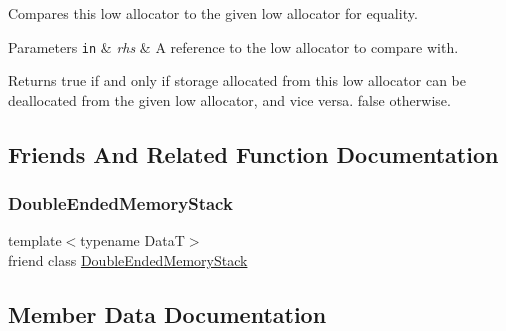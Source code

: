 Compares this low allocator to the given low allocator for equality.


\begin{DoxyParams}[1]{Parameters}
\mbox{\tt in}  & {\em rhs} & A reference to the low allocator to compare with. \\
\hline
\end{DoxyParams}
\begin{DoxyReturn}{Returns}
{\ttfamily true} if and only if storage allocated from this low allocator can be deallocated from the given low allocator, and vice versa. {\ttfamily false} otherwise. 
\end{DoxyReturn}


\subsection{Friends And Related Function Documentation}
\hypertarget{structmage_1_1_double_ended_memory_stack_1_1_low_allocator_a10ae729d55b8c0017057250445835680}{}\label{structmage_1_1_double_ended_memory_stack_1_1_low_allocator_a10ae729d55b8c0017057250445835680} 
\subsubsection{\texorpdfstring{Double\+Ended\+Memory\+Stack}{DoubleEndedMemoryStack}}
{\footnotesize\ttfamily template$<$typename DataT$>$ \\
friend class \hyperlink{classmage_1_1_double_ended_memory_stack}{Double\+Ended\+Memory\+Stack}\hspace{0.3cm}{\ttfamily [friend]}}



\subsection{Member Data Documentation}
\hypertarget{structmage_1_1_double_ended_memory_stack_1_1_low_allocator_a2162e2789f0add4d7a9aac5408c1e7d5}{}\label{structmage_1_1_double_ended_memory_stack_1_1_low_allocator_a2162e2789f0add4d7a9aac5408c1e7d5} 

